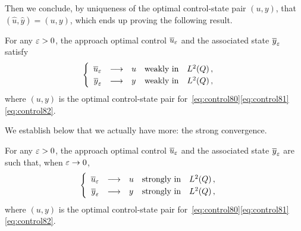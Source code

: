 Then we conclude, by uniqueness of the optimal control-state pair $(u,y)$,
that $\left({\hat{u},\hat{y}}\right) = (u,y)$, which ends up proving the
following result.

\begin{proposition}%
    For any $\varepsilon > 0$, the approach optimal control ${\overline{u}}_{\varepsilon}$ and the
    associated state ${\overline{y}}_{\varepsilon}$ satisfy
    \begin{equation*}
        \begin{cases}\displaystyle
            \begin{array}{rclll}
                {\overline{u}}_{\varepsilon} & \longrightarrow & u & \text{weakly in} &
                L^{2}\!\left({Q}\right),\\
                {\overline{y}}_{\varepsilon} & \longrightarrow & y & \text{weakly in} &
                L^{2}\!\left({Q}\right),
            \end{array}
        \end{cases}
    \end{equation*}
    where $(u,y)$ is the optimal control-state pair
    for~\eqref{eq:control80}\eqref{eq:control81}\eqref{eq:control82}.
\end{proposition}

We establish below that we actually have more: the strong convergence.

\begin{theoreme}%
    For any $\varepsilon > 0$, the approach optimal control ${\overline{u}}_{\varepsilon}$ and the
    associated state ${\overline{y}}_{\varepsilon}$ are such that, when $\varepsilon \to 0$,
    \begin{equation*}
        \begin{cases}\displaystyle
            \begin{array}{rclll}
                {\overline{u}}_{\varepsilon} & \longrightarrow & u & \text{strongly in} &
                L^{2}\!\left({Q}\right),\\
                {\overline{y}}_{\varepsilon} & \longrightarrow & y & \text{strongly in} &
                L^{2}\!\left({Q}\right),
            \end{array}
        \end{cases}
    \end{equation*}
    where $(u,y)$ is the optimal control-state pair
    for~\eqref{eq:control80}\eqref{eq:control81}\eqref{eq:control82}.
\end{theoreme}

